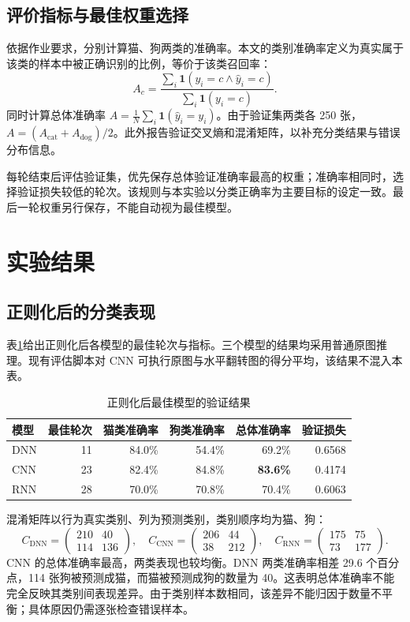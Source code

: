 \documentclass[UTF8,a4paper,zihao=-4,fontset=fandol]{ctexart}
\begin{document}
\subsection{评价指标与最佳权重选择}
依据作业要求，分别计算猫、狗两类的准确率。本文的类别准确率定义为真实属于该类的样本中被正确识别的比例，等价于该类召回率：
\begin{equation}
 A_c=\frac{\sum_i\mathbf{1}(y_i=c\land\hat y_i=c)}{\sum_i\mathbf{1}(y_i=c)}.
\end{equation}
同时计算总体准确率 $A=\frac{1}{N}\sum_i\mathbf{1}(\hat y_i=y_i)$。由于验证集两类各 250 张，$A=(A_{\mathrm{cat}}+A_{\mathrm{dog}})/2$。此外报告验证交叉熵和混淆矩阵，以补充分类结果与错误分布信息。

每轮结束后评估验证集，优先保存总体验证准确率最高的权重；准确率相同时，选择验证损失较低的轮次。该规则与本实验以分类正确率为主要目标的设定一致。最后一轮权重另行保存，不能自动视为最佳模型。

\section{实验结果}
\subsection{正则化后的分类表现}
表\ref{tab:result}给出正则化后各模型的最佳轮次与指标。三个模型的结果均采用普通原图推理。现有评估脚本对 CNN 可执行原图与水平翻转图的得分平均，该结果不混入本表。

\begin{table}[htbp]
\centering\small
\caption{正则化后最佳模型的验证结果}\label{tab:result}
\begin{tabular}{lrrrrr}
\toprule
模型 & 最佳轮次 & 猫类准确率 & 狗类准确率 & 总体准确率 & 验证损失\\
\midrule
DNN & 11 & 84.0\% & 54.4\% & 69.2\% & 0.6568\\
CNN & 23 & 82.4\% & 84.8\% & \textbf{83.6\%} & 0.4174\\
RNN & 28 & 70.0\% & 70.8\% & 70.4\% & 0.6063\\
\bottomrule
\end{tabular}
\end{table}

混淆矩阵以行为真实类别、列为预测类别，类别顺序均为猫、狗：
\begin{equation}
 C_{\mathrm{DNN}}=\begin{pmatrix}210&40\\114&136\end{pmatrix},\quad
 C_{\mathrm{CNN}}=\begin{pmatrix}206&44\\38&212\end{pmatrix},\quad
 C_{\mathrm{RNN}}=\begin{pmatrix}175&75\\73&177\end{pmatrix}.
\end{equation}
CNN 的总体准确率最高，两类表现也较均衡。DNN 两类准确率相差 29.6 个百分点，114 张狗被预测成猫，而猫被预测成狗的数量为 40。这表明总体准确率不能完全反映其类别间表现差异。由于类别样本数相同，该差异不能归因于数量不平衡；具体原因仍需逐张检查错误样本。
\end{document}
